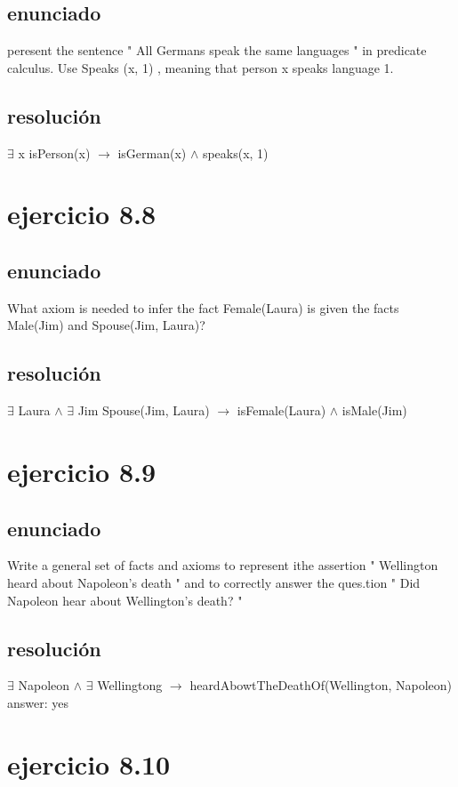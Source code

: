 \documentclass[a4paper,10pt]{article}
\newcommand\tab[1][1cm]{\hspace*{#1}}
\begin{document}
\subsection{enunciado}
peresent the sentence " All Germans speak the same languages " in predicate calculus. Use Speaks (x, 1) , meaning that person x speaks language 1.
\subsection{resolución}
$\exists$ x isPerson(x) $\rightarrow$ isGerman(x) $\land$ speaks(x, 1)

\section{ejercicio 8.8}
\subsection{enunciado}
What axiom is needed to infer the fact Female(Laura) is given the facts Male(Jim) and Spouse(Jim, Laura)?
\subsection{resolución}
$\exists$ Laura $\land$ $\exists$ Jim Spouse(Jim, Laura) $\rightarrow$ isFemale(Laura) $\land$ isMale(Jim)

\section{ejercicio 8.9}
\subsection{enunciado}
Write a  general  set of facts  and  axioms to represent ithe assertion " Wellington heard about  Napoleon's  death " and  to  correctly  answer  the ques.tion " Did Napoleon  hear  about Wellington's death? "
\subsection{resolución}
$\exists$ Napoleon $\land$ $\exists$ Wellingtong $\rightarrow$ heardAbowtTheDeathOf(Wellington, Napoleon)
\\\tab answer: yes

\pagebreak

\section{ejercicio 8.10}
\end{document}
